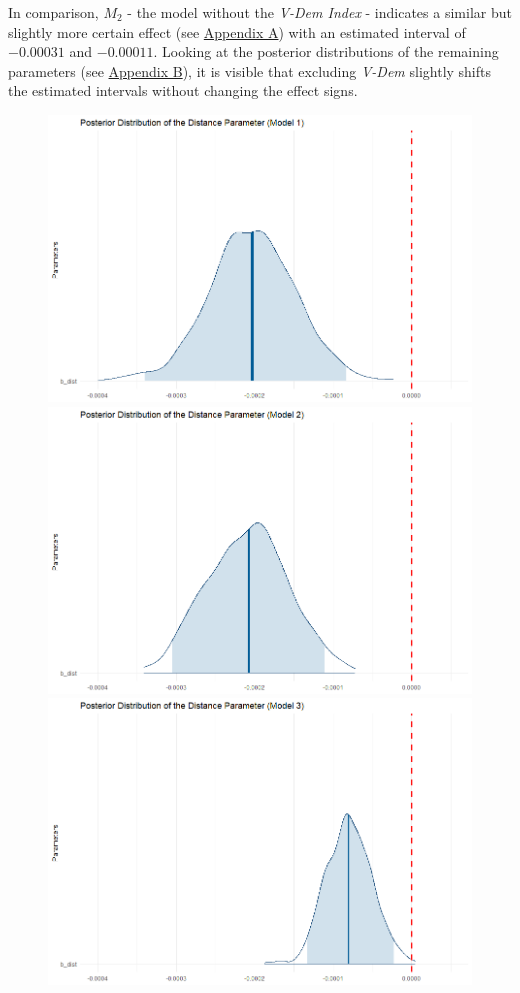 \documentclass[12pt,a4paper]{article}
\begin{document}
In comparison, $M_2$ - the model without the \textit{V-Dem Index} -  indicates a similar but slightly more certain effect (see \hyperref[Appendix Tables]{\color{blue}Appendix A}) with an estimated interval of $-0.00031$ and $-0.00011$. Looking at the posterior distributions of the remaining parameters (see \hyperref[Appendix Figures]{\color{blue}Appendix B}), it is visible that excluding \textit{V-Dem} slightly shifts the estimated intervals without changing the effect signs.

\begin{figure}[h]
\center
\label{F:5}
\includegraphics[scale=0.2]{PosteriorPlot_Distance_Model1.png}
\includegraphics[scale=0.2]{PosteriorPlot_Distance_Model2.png}
\includegraphics[scale=0.2]{PosteriorPlot_Distance_Model3.png}

\end{figure}
\end{document}
